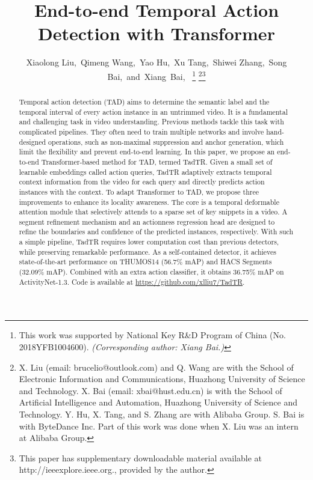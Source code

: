 \documentclass[lettersize,journal]{IEEEtran}
\begin{document}
\title{End-to-end Temporal Action Detection with Transformer}

\author{Xiaolong Liu,~Qimeng Wang,~Yao Hu,~Xu Tang,~Shiwei Zhang,~Song Bai,~and~Xiang~Bai,~
\thanks{This work was supported by National Key R\&D Program of China (No. 2018YFB1004600). \textit{(Corresponding author: Xiang Bai.)}}
\thanks{X. Liu (email: brucelio@outlook.com) and Q. Wang are with the School of Electronic Information and Communications, Huazhong University of Science and Technology. X. Bai (email: xbai@hust.edu.cn) is with the School of Artificial Intelligence and Automation, Huazhong University of Science and Technology. 
Y. Hu, X. Tang, and S. Zhang are with Alibaba Group. S. Bai is with ByteDance Inc.
Part of this work was done when X. Liu was an intern at Alibaba Group.}\thanks{This paper has supplementary downloadable material available at http://ieeexplore.ieee.org., provided by the author.}
}




\maketitle

\begin{abstract}
Temporal action detection (TAD) aims to determine the semantic label and the temporal interval of every action instance in an untrimmed video. It is a fundamental and challenging task in video understanding. Previous methods tackle this task with complicated pipelines. They often need to train multiple networks and involve hand-designed operations, such as non-maximal suppression and anchor generation, which limit the flexibility and prevent end-to-end learning. In this paper, we propose an end-to-end Transformer-based method for TAD, termed TadTR. Given a  small set of learnable embeddings called action queries, TadTR adaptively extracts temporal context information from the video for each query and directly predicts action instances with the context. To adapt Transformer to TAD, we propose three improvements to enhance its locality awareness. The core is a temporal deformable attention module that selectively attends to a sparse set of key snippets in a video. A segment refinement mechanism and an actionness regression head are designed to refine the boundaries and confidence of the predicted instances, respectively. With such a simple pipeline, TadTR requires lower computation cost than previous detectors, while preserving remarkable performance. As a self-contained detector, it achieves state-of-the-art performance on THUMOS14 (56.7\% mAP) and HACS Segments  (32.09\% mAP). Combined with an extra action classifier, it obtains 36.75\% mAP on ActivityNet-1.3. Code is available at \url{https://github.com/xlliu7/TadTR}.
\end{abstract}
\end{document}
